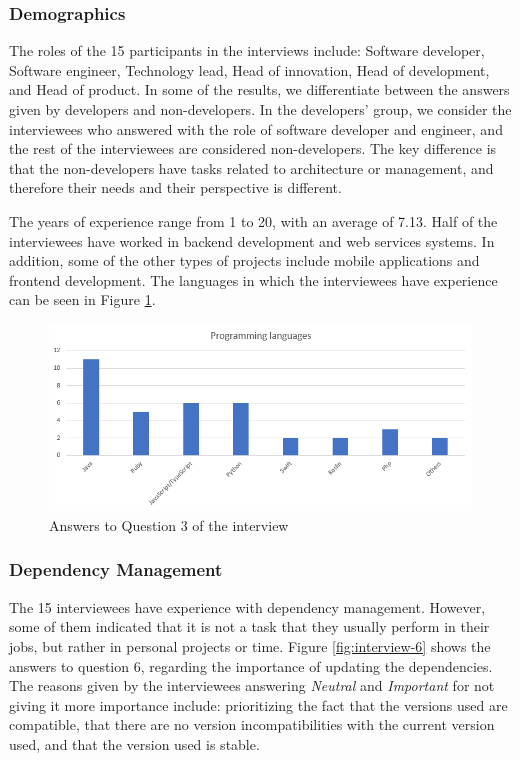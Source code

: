 \subsubsection{Demographics}

The roles of the 15 participants in the interviews include: Software developer, Software engineer, Technology lead, Head of innovation, Head of development, and Head of product. In some of the results, we differentiate between the answers given by developers and non-developers. In the developers' group, we consider the interviewees who answered with the role of software developer and engineer, and the rest of the interviewees are considered non-developers. The key difference is that the non-developers have tasks related to architecture or management, and therefore their needs and their perspective is different.

The years of experience range from 1 to 20, with an average of 7.13. Half of the interviewees have worked in backend development and web services systems. In addition, some of the other types of projects include mobile applications and frontend development. The languages in which the interviewees have experience can be seen in Figure \ref{fig:interview-3}.

\begin{figure}[ht!]
\begin{center}
\includegraphics[width=\textwidth]{figures/interview/Question3.png}
\caption{Answers to Question 3 of the interview}
\label{fig:interview-3}
\end{center}
\end{figure}

\subsubsection{Dependency Management}

The 15 interviewees have experience with dependency management. However, some of them indicated that it is not a task that they usually perform in their jobs, but rather in personal projects or time. Figure \ref{fig:interview-6} shows the answers to question 6, regarding the importance of updating the dependencies. The reasons given by the interviewees answering \textit{Neutral} and \textit{Important} for not giving it more importance include: prioritizing the fact that the versions used are compatible, that there are no version incompatibilities with the current version used, and that the version used is stable.

